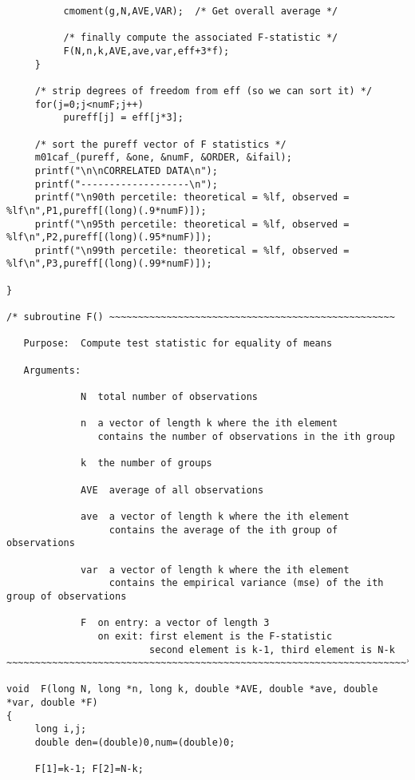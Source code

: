 \documentclass{article}
\begin{document}
\begin{verbatim}
          cmoment(g,N,AVE,VAR);  /* Get overall average */

          /* finally compute the associated F-statistic */
          F(N,n,k,AVE,ave,var,eff+3*f);
     }
     
     /* strip degrees of freedom from eff (so we can sort it) */
     for(j=0;j<numF;j++)
          pureff[j] = eff[j*3];

     /* sort the pureff vector of F statistics */
     m01caf_(pureff, &one, &numF, &ORDER, &ifail);     
     printf("\n\nCORRELATED DATA\n");
     printf("-------------------\n");
     printf("\n90th percetile: theoretical = %lf, observed = %lf\n",P1,pureff[(long)(.9*numF)]);
     printf("\n95th percetile: theoretical = %lf, observed = %lf\n",P2,pureff[(long)(.95*numF)]);
     printf("\n99th percetile: theoretical = %lf, observed = %lf\n",P3,pureff[(long)(.99*numF)]);

}

/* subroutine F() ~~~~~~~~~~~~~~~~~~~~~~~~~~~~~~~~~~~~~~~~~~~~~~~~~~
   
   Purpose:  Compute test statistic for equality of means

   Arguments:
   
             N  total number of observations

             n  a vector of length k where the ith element
                contains the number of observations in the ith group
             
             k  the number of groups

             AVE  average of all observations

             ave  a vector of length k where the ith element
                  contains the average of the ith group of observations

             var  a vector of length k where the ith element
                  contains the empirical variance (mse) of the ith group of observations

             F  on entry: a vector of length 3
                on exit: first element is the F-statistic
                         second element is k-1, third element is N-k
~~~~~~~~~~~~~~~~~~~~~~~~~~~~~~~~~~~~~~~~~~~~~~~~~~~~~~~~~~~~~~~~~~~~~~*/
             
void  F(long N, long *n, long k, double *AVE, double *ave, double *var, double *F)
{
     long i,j;
     double den=(double)0,num=(double)0;
     
     F[1]=k-1; F[2]=N-k;
     

\end{verbatim}
\end{document}
